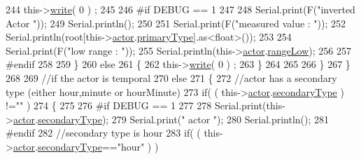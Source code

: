 \begin{DoxyCode}
244                         this->\hyperlink{class_cool_board_actor_a958786ff01ea1056ee72c72d439f86da}{write}( 0 ) ;
245 
246 \textcolor{preprocessor}{                    #if DEBUG == 1}
247                         
248                         Serial.print(F(\textcolor{stringliteral}{"inverted Actor "}));
249                         Serial.println();
250 
251                         Serial.print(F(\textcolor{stringliteral}{"measured value : "}));
252                         Serial.println(root[this->\hyperlink{class_cool_board_actor_a8f190db9f7a39fddbcef7f152da970e9}{actor}.\hyperlink{struct_cool_board_actor_1_1state_a8a0b318fd2814cf67fe74ee8164df55e}{primaryType}].as<\textcolor{keywordtype}{float}>());
253 
254                         Serial.print(F(\textcolor{stringliteral}{"low range : "}));
255                         Serial.println(this->\hyperlink{class_cool_board_actor_a8f190db9f7a39fddbcef7f152da970e9}{actor}.\hyperlink{struct_cool_board_actor_1_1state_a43f891c9fb3bb63575c27cec860de55a}{rangeLow});
256                     
257 \textcolor{preprocessor}{                    #endif}
258                                         
259                     \}
260                     \textcolor{keywordflow}{else} 
261                     \{
262                         this->\hyperlink{class_cool_board_actor_a958786ff01ea1056ee72c72d439f86da}{write}( 0 ) ;                     
263                     \}
264 
265                 
266                 \}
267             \}
268 
269             \textcolor{comment}{//if the actor is temporal}
270             \textcolor{keywordflow}{else}
271             \{
272                 \textcolor{comment}{//actor has a secondary type (either hour,minute or hourMinute)}
273                 \textcolor{keywordflow}{if}( ( this->\hyperlink{class_cool_board_actor_a8f190db9f7a39fddbcef7f152da970e9}{actor}.\hyperlink{struct_cool_board_actor_1_1state_a44e8f69868f2491b79ed075f84aa0fcb}{secondaryType} ) !=\textcolor{stringliteral}{""} )  
274                 \{
275                 
276 \textcolor{preprocessor}{                #if DEBUG == 1}
277                     
278                     Serial.print(this->\hyperlink{class_cool_board_actor_a8f190db9f7a39fddbcef7f152da970e9}{actor}.\hyperlink{struct_cool_board_actor_1_1state_a44e8f69868f2491b79ed075f84aa0fcb}{secondaryType});
279                     Serial.print(\textcolor{stringliteral}{" actor "});
280                     Serial.println();
281 \textcolor{preprocessor}{                #endif}
282                     \textcolor{comment}{//secondary type is hour    }
283                     \textcolor{keywordflow}{if}( ( this->\hyperlink{class_cool_board_actor_a8f190db9f7a39fddbcef7f152da970e9}{actor}.\hyperlink{struct_cool_board_actor_1_1state_a44e8f69868f2491b79ed075f84aa0fcb}{secondaryType}==\textcolor{stringliteral}{"hour"} ) )

\end{DoxyCode}
